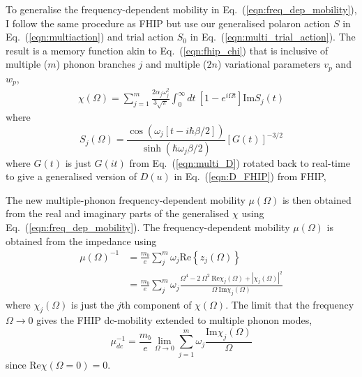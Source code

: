 To generalise the frequency-dependent mobility in Eq.~(\ref{eqn:freq_dep_mobility}), I follow the same procedure as FHIP but use our generalised polaron action $S$ in Eq.~(\ref{eqn:multiaction}) and trial action $S_0$ in Eq.~(\ref{eqn:multi_trial_action}). The result is a memory function akin to Eq.~(\ref{eqn:fhip_chi}) that is inclusive of multiple ($m$) phonon branches $j$ and multiple ($2n$) variational parameters $v_{p}$ and $w_{p}$,
\begin{equation} \label{eqn:multi_memory}
    \begin{gathered}
        \chi(\Omega) = \sum_{j=1}^m \frac{2\alpha_j\omega^2_j}{3\sqrt{\pi}} \int_0^{\infty} dt\ \left[1 - e^{i\Omega t}\right] \textrm{Im} S_j(t)
    \end{gathered}
\end{equation}
where
\begin{equation}
    S_j(\Omega) = \frac{\cos \left(\omega_j \left[t - i\hbar\beta/2\right]\right)}{\sinh (\hbar\omega_j\beta/2)} [G(t)]^{-3/2}
\end{equation}
where $G(t)$ is just $G(it)$ from Eq.~(\ref{eqn:multi_D}) rotated back to real-time to give a generalised version of $D(u)$ in Eq.~(\ref{eqn:D_FHIP}) from FHIP,

The new multiple-phonon frequency-dependent mobility $\mu(\Omega)$ is then obtained from the real and imaginary parts of the generalised $\chi$ using Eq.~(\ref{eqn:freq_dep_mobility}). The frequency-dependent mobility $\mu(\Omega)$ is obtained from the impedance using
\begin{equation}\label{eqn:freq_dep_mobility}
\begin{aligned}
    \mu(\Omega)^{-1} &= \frac{m_b}{e} \sum_j^m \omega_j \textrm{Re}\left\{z_j(\Omega)\right\} \\
    &= \frac{m_b}{e} \sum_j^m \omega_j \frac{\Omega^4 - 2\ \Omega^2\  \textrm{Re}\chi_j(\Omega) + |\chi_j(\Omega)|^2}{\Omega\ \textrm{Im}\chi_j(\Omega)}
\end{aligned}
\end{equation}
where $\chi_j(\Omega)$ is just the $j$th component of $\chi(\Omega)$. The limit that the frequency $\Omega \rightarrow 0$ gives the FHIP dc-mobility extended to multiple phonon modes,
\begin{equation}
    \mu^{-1}_{dc} = \frac{m_b}{e}\lim_{\Omega \rightarrow 0} \sum_{j=1}^m \omega_j \frac{\textrm{Im}\chi_j(\Omega)}{\Omega}
\end{equation}
since $\textrm{Re}\chi(\Omega = 0) = 0$.

